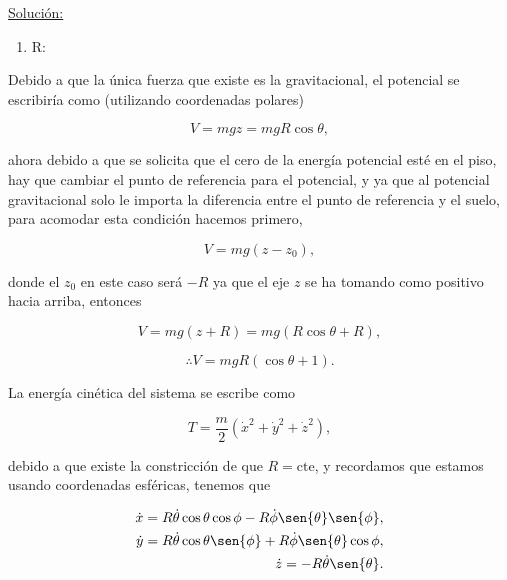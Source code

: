 \documentclass[a4paper,10pt]{article}
\numberwithin{equation}{section}
\begin{document}
\underline{Solución:} \vspace{.3cm}

\begin{enumerate}[label=\alph*)]
 \item R:
\end{enumerate}

Debido a que la única fuerza que existe es la gravitacional, el potencial se 
escribiría como (utilizando coordenadas polares)

\begin{equation}
 V = mgz = mgR\cos{\theta},
\end{equation}

ahora debido a que se solicita que el cero de la energía potencial esté en el piso, 
hay que cambiar el punto de referencia para el potencial, y ya que al potencial 
gravitacional solo le importa la diferencia entre el punto de referencia y el suelo, 
para acomodar esta condición hacemos primero,

\begin{equation}
 V = mg(z - z_0),
\end{equation}

donde el $z_0$ en este caso será $-R$ ya que el eje $z$ se ha tomando como positivo 
hacia arriba, entonces 

\begin{equation}
 V = mg(z + R) = mg(R\cos{\theta} + R),
\end{equation}

\begin{equation}
 \therefore V = mgR(\cos{\theta} + 1).
\end{equation}

La energía cinética del sistema se escribe como 

\begin{equation}
 T = \frac{m}{2}(\dot{x}^2 + \dot{y}^2 + \dot{z}^2),
\end{equation}

debido a que existe la constricción de que $R = \text{cte}$, y recordamos que 
estamos usando coordenadas esféricas, tenemos que 

\begin{align*}
 \dot{x} = R\dot{\theta}\cos{\theta}\cos{\phi} - R\dot{\phi}\sen{\theta}\sen{\phi}, \\
 \dot{y} = R\dot{\theta}\cos{\theta}\sen{\phi} + R\dot{\phi}\sen{\theta}\cos{\phi}, \\
 \dot{z} = - R\dot{\theta}\sen{\theta}.
\end{align*}
\end{document}
